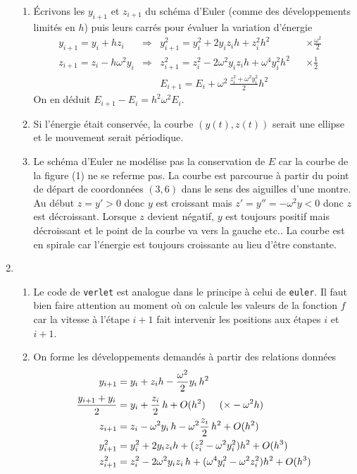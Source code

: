 \begin{enumerate}
\begin{enumerate}
  \item \'Ecrivons les $y_{i+1}$ et $z_{i+1}$ du schéma d'Euler (comme des développements limités en $h$) puis leurs carrés pour évaluer la variation d'énergie
\begin{align*}
y_{i+1} = y_i + hz_i &\Rightarrow &y_{i+1}^2   = y_i^2 + 2y_iz_i h + z_i^2 h^2 & &\times \frac{\omega^2}{2}&\\
z_{i+1} = z_i - h\omega^2 y_i &\Rightarrow &z_{i+1}^2 = z_i^2 - 2\omega^2 y_iz_i h + \omega^4 y_i^2 h^2 &  &\times \frac{1}{2}&\\
 & &E_{i+1} = E_i + \omega^2 \, \frac{z_i^2 + \omega^2 y_i^2}{2}h^2 & & &
\end{align*}
On en déduit $E_{i+1}-E_i = h^2 \omega^2 E_i$.

  \item Si l'énergie était conservée, la courbe $(y(t),z(t))$ serait une ellipse et le mouvement serait périodique.
  \item Le schéma d'Euler ne modélise pas la conservation de $E$ car la courbe de la figure (1) ne se referme pas. La courbe est parcourue à partir du point de départ de coordonnées $(3,6)$ dans le sens des aiguilles d'une montre. Au début $z=y' >0$ donc $y$ est croissant mais $z'=y''=-\omega^2 y <0$ donc $z$ est décroissant. Lorsque $z$ devient négatif, $y$ est toujours positif mais décroissant et le point de la courbe va vers la gauche etc.. La courbe est en spirale car l'énergie est toujours croissante au lieu d'être constante.
\end{enumerate}

  \item
\begin{enumerate}
  \item Le code de \texttt{verlet} est analogue dans le principe à celui de \texttt{euler}. Il faut bien faire attention au moment où on calcule les valeurs de la fonction $f$ car la vitesse à l'étape $i+1$ fait intervenir les positions aux étapes $i$ et $i+1$.
  
  \item On forme les développements demandés à partir des relations données
\begin{align*}
  y_{i+1} &= y_i + z_ih -\frac{\omega^2}{2}y_i\,h^2 \\
  \frac{y_{i+1}+y_i}{2} &= y_i + \frac{z_i}{2}\,h + O(h^2) \hspace{0.5cm}(\times -\omega^2 h)\\
  z_{i+1} &= z_i -\omega^2y_i\,h -\omega^2\frac{z_i}{2}\,h^2 + O(h^2) \\
  y_{i+1}^2 &= y_i^2 + 2y_iz_i h +(z_i^2-\omega^2 y_i^2)h^2 + O(h^3) \\
  z_{i+1}^2 &= z_i^2 -2\omega^2 y_i z_i\,h +(\omega^4y_i^2 -\omega^2 z_i^2)h^2 + O(h^3)
\end{align*}


\end{enumerate}
\end{enumerate}
